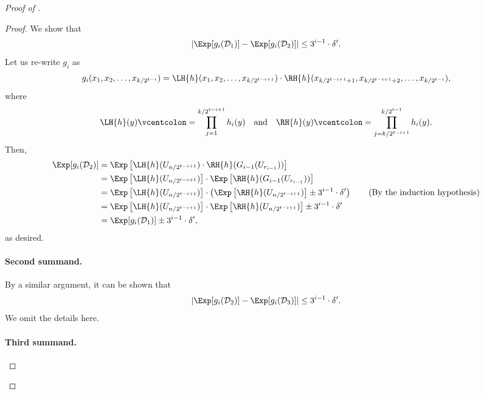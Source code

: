 \begin{proof}[Proof of ]
\begin{proof}
	    	We show that
            \begin{equation}\label{eq:prg-lc-triangle-1}
				\left|\Exp[g_i(\mathcal{D}_1)]-\Exp[g_i(\mathcal{D}_2)]\right| \leq 3^{i-1}\cdot \delta'.
			\end{equation}
			Let us re-write $g_i$ as
	    	\[
	    		g_i(x_1,x_2,\dots,x_{k/2^{t-i}})=\LH{h}(x_1,x_2,\dots,x_{k/2^{t-i+1}})\cdot \RH{h}(x_{k/2^{t-i+1}+1},x_{k/2^{t-i+1}+2},\dots,x_{k/2^{t-i}}),
	    	\]
	    	where
	    	\[
	    	    \LH{h}(y)\vcentcolon=\prod_{j=1}^{k/2^{t-i+1}}h_i(y) \text{\quad and\quad  } \RH{h}(y)\vcentcolon=\prod_{j=k/2^{t-i+1}}^{k/2^{t-1}}h_i(y).
	    	\]
	    	Then,
	    	\begin{align*}
	    		\Exp[g_i(\mathcal{D}_2)]&=\Exp\left[\LH{h}(U_{n/2^{t-i+1}})\cdot \RH{h}(G_{i-1}(U_{r_{i-1}}))\right]\\
	    		&=\Exp\left[\LH{h}(U_{n/2^{t-i+1}})\right]\cdot\Exp\left[\RH{h}(G_{i-1}(U_{r_{i-1}}))\right]\\
	    		&=\Exp\left[\LH{h}(U_{n/2^{t-i+1}})\right]\cdot\left(\Exp\left[\RH{h}(U_{n/2^{t-i+1}})\right]\pm 3^{i-1}\cdot \delta'\right)
	    		\tag{By the induction hypothesis}\\
	    		&=\Exp\left[\LH{h}(U_{n/2^{t-i+1}})\right]\cdot\Exp\left[\RH{h}(U_{n/2^{t-i+1}})\right] \pm 3^{i-1}\cdot \delta'\\
	    		&=\Exp[g_i(\mathcal{D}_1)]\pm 3^{i-1}\cdot \delta',
	    	\end{align*}
	    	as desired.
	    	
	    	\paragraph{Second summand.}
	    	
	    	By a similar argument, it can be shown that
            \begin{equation}\label{eq:prg-lc-triangle-2}
				\left|\Exp[g_i(\mathcal{D}_2)]-\Exp[g_i(\mathcal{D}_3)]\right| \leq 3^{i-1}\cdot \delta'.
			\end{equation}
			We omit the details here.
	    	
	    	\paragraph{Third summand.}
	    	

\end{proof}
\end{proof}
